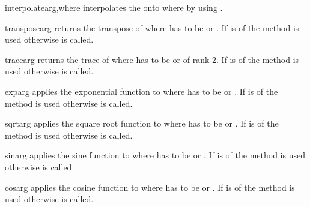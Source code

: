 \begin{funcdesc}{interpolate}{arg,where}
interpolates the \Data {} onto  where by
using . 
\end{funcdesc}

\begin{funcdesc}{transpose}{arg}
returns the transpose of  where  has to be
\Data or . If  is of
\Data the method  is used otherwise
 is called. 
\end{funcdesc}

\begin{funcdesc}{trace}{arg}
returns the trace of  where  has to be \Data
or  of rank 2. If  is of \Data
the method  is used otherwise
 is called. 
\end{funcdesc}

\begin{funcdesc}{exp}{arg}
applies the exponential function to  where  has to
be \Data or . If  is of
\Data the method  is used otherwise
 is called. 
\end{funcdesc}

\begin{funcdesc}{sqrt}{arg}
applies the square root function to  where  has to
be \Data or . If  is of
\Data the method  is used otherwise
 is called. 
\end{funcdesc}

\begin{funcdesc}{sin}{arg}
applies the sine function to  where  has to be
\Data or . If  is of
\Data the method  is used otherwise
 is called. 
\end{funcdesc}

\begin{funcdesc}{cos}{arg}
applies the cosine function to  where  has to be
\Data or . If  is of
\Data the method  is used otherwise
 is called. 
\end{funcdesc}

